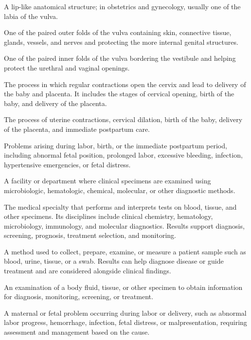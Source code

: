  A lip-like anatomical structure; in obstetrics and gynecology, usually one of the labia of the vulva.

 One of the paired outer folds of the vulva containing skin, connective tissue, glands, vessels, and nerves and protecting the more internal genital structures.

 One of the paired inner folds of the vulva bordering the vestibule and helping protect the urethral and vaginal openings.

 The process in which regular contractions open the cervix and lead to delivery of the baby and placenta. It includes the stages of cervical opening, birth of the baby, and delivery of the placenta.

 The process of uterine contractions, cervical dilation, birth of the baby, delivery of the placenta, and immediate postpartum care.

 Problems arising during labor, birth, or the immediate postpartum period, including abnormal fetal position, prolonged labor, excessive bleeding, infection, hypertensive emergencies, or fetal distress.

 A facility or department where clinical specimens are examined using microbiologic, hematologic, chemical, molecular, or other diagnostic methods.

 The medical specialty that performs and interprets tests on blood, tissue, and other specimens. Its disciplines include clinical chemistry, hematology, microbiology, immunology, and molecular diagnostics. Results support diagnosis, screening, prognosis, treatment selection, and monitoring.

 A method used to collect, prepare, examine, or measure a patient sample such as blood, urine, tissue, or a swab. Results can help diagnose disease or guide treatment and are considered alongside clinical findings.

 An examination of a body fluid, tissue, or other specimen to obtain information for diagnosis, monitoring, screening, or treatment.

 A maternal or fetal problem occurring during labor or delivery, such as abnormal labor progress, hemorrhage, infection, fetal distress, or malpresentation, requiring assessment and management based on the cause.

